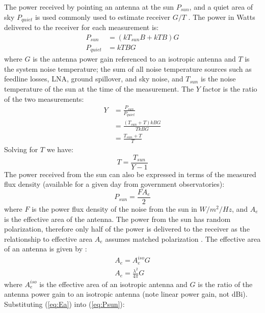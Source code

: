 \documentclass{article}
\begin{document}
The power received by pointing an antenna at the sun $P_{sun}$, and a quiet area of sky $P_{quiet}$ is used commonly used to estimate receiver $G/T$ \cite{flagg2006_det_gt}.  The power in Watts delivered to the receiver for each measurement is:
\begin{equation}
\begin{split}
P_{sun} &= (kT_{sun}B+kTB)G \\
P_{quiet} &= kTBG 
\end{split}
\end{equation}
where $G$ is the antenna power gain referenced to an isotropic antenna and $T$ is the system noise temperature; the sum of all noise temperature sources such as feedline losses, LNA, ground spillover, and sky noise, and $T_{sun}$ is the noise temperature of the sun at the time of the measurement. The $Y$ factor is the ratio of the two  measurements:
\begin{equation}
\begin{split}
Y &= \frac{P_{sun}}{P_{quiet}} \\
  &= \frac{(T_{sun}+T)kBG}{TkBG} \\
  &= \frac{T_{sun}+T}{T} 
\end{split}
\end{equation}
Solving for $T$ we have:
\begin{equation} \label{eq:T}
T = \frac{T_{sun}}{Y-1}
\end{equation}
The power received from the sun can also be expressed in terms of the measured flux density (available for a given day from government observatories):
\begin{equation} \label{eq:Psun}
P_{sun} = \frac{FA_e}{2}
\end{equation}
where $F$ is the power flux density of the noise from the sun in $W/m^2/Hz$, and $A_e$ is the effective area of the antenna. The power from the sun has random polarization, therefore only half of the power is delivered to the receiver as the relationship to effective area $A_e$ assumes matched polarization \cite[p 778]{kraus1988antennas}. The effective area of an antenna is given by \cite[Eq 2.3]{zavrel_antenna_physics}:
\begin{equation}
\begin{split} \label{eq:Ea}
A_e = A_e^{iso}G \\
A_e = \frac{\lambda^2}{4\pi}G
\end{split}
\end{equation}
where $A_e^{iso}$ is the effective area of an isotropic antenna and $G$ is the ratio of the antenna power gain to an isotropic antenna (note linear power gain, not dBi). Substituting (\ref{eq:Ea}) into (\ref{eq:Psun}):
\end{document}
